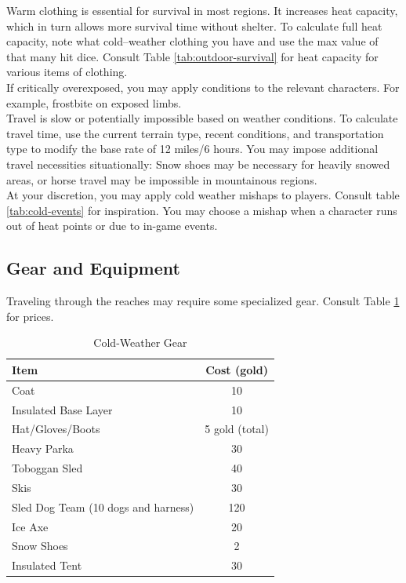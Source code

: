 \documentclass[notitlepage]{article}
\begin{document}
\begin{multicols*}{2}
Warm clothing is essential for survival in most regions.
It increases heat capacity, which in turn allows more survival time without shelter.
To calculate full heat capacity, note what cold--weather clothing you have and use the max value of that many hit dice.
Consult Table \ref{tab:outdoor-survival} for heat capacity for various items of clothing. \\

If critically overexposed, you may apply conditions to the relevant characters.
For example, frostbite on exposed limbs. \\

Travel is slow or potentially impossible based on weather conditions.
To calculate travel time, use the current terrain type, recent conditions, and transportation type to modify the base rate of 12 miles/6 hours.
You may impose additional travel necessities situationally: Snow shoes may be necessary for heavily snowed areas, or horse travel may be impossible in mountainous regions. \\

At your discretion, you may apply cold weather mishaps to players.
Consult table \ref{tab:cold-events} for inspiration.
You may choose a mishap when a character runs out of heat points or due to in-game events.


\subsection*{Gear and Equipment}

Traveling through the reaches may require some specialized gear.
Consult Table \ref{tab:gear} for prices.

\begin{table}[t]
  \centering
  \begin{tabular}{|p{}|c|} \hline
    Item & Cost (gold)  \\ \hline
    Coat & 10  \\
    Insulated Base Layer & 10 \\ 
    Hat/Gloves/Boots & 5 gold (total) \\
    Heavy Parka & 30 \\
    Toboggan Sled & 40 \\
    Skis & 30 \\
    Sled Dog Team (10 dogs and harness) & 120 \\
    Ice Axe & 20 \\
    Snow Shoes & 2 \\
    Insulated Tent & 30 \\
 \hline \end{tabular}
  \caption{Cold-Weather Gear}
  \label{tab:gear}
\end{table}


\end{multicols*}
\end{document}
